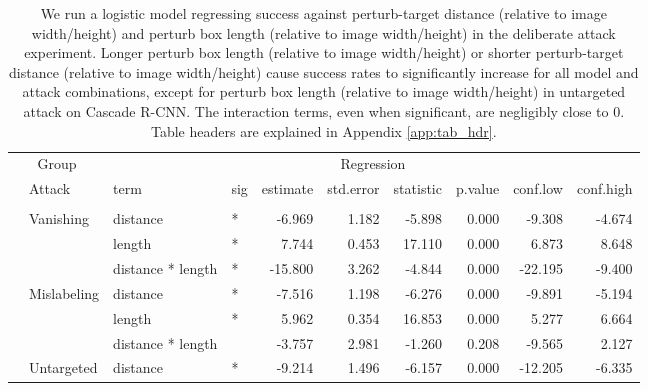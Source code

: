 \begingroup\fontsize{9}{11}\selectfont

\begin{longtable}[t]{llllrrrrrr}
\caption{\label{tab:arbitrary_trend_table}We run a logistic model regressing success against perturb-target distance (relative to image width/height) and perturb box length (relative to image width/height) in the deliberate attack experiment. Longer perturb box length (relative to image width/height) or shorter perturb-target distance (relative to image width/height) cause success rates to significantly increase for all model and attack combinations, except for perturb box length (relative to image width/height) in untargeted attack on Cascade R-CNN. The interaction terms, even when significant, are negligibly close to 0. Table headers are explained in Appendix \ref{app:tab_hdr}.}\\
\toprule
\multicolumn{2}{c}{Group} & \multicolumn{8}{c}{Regression} \\
\cmidrule(l{3pt}r{3pt}){1-2} \cmidrule(l{3pt}r{3pt}){3-10}
 & Attack & term & sig & estimate & std.error & statistic & p.value & conf.low & conf.high\\
\midrule
\addlinespace[0.3em]
\multicolumn{10}{l}{\textbf{YOLOv3}}\\
\hspace{1em} & Vanishing & distance & * & -6.969 & 1.182 & -5.898 & 0.000 & -9.308 & -4.674\\
\cmidrule{3-10}\nopagebreak
\hspace{1em} &  & length & * & 7.744 & 0.453 & 17.110 & 0.000 & 6.873 & 8.648\\
\cmidrule{3-10}\nopagebreak
\hspace{1em} &  & distance * length & * & -15.800 & 3.262 & -4.844 & 0.000 & -22.195 & -9.400\\
\cmidrule{2-10}\nopagebreak
\hspace{1em} & Mislabeling & distance & * & -7.516 & 1.198 & -6.276 & 0.000 & -9.891 & -5.194\\
\cmidrule{3-10}\nopagebreak
\hspace{1em} &  & length & * & 5.962 & 0.354 & 16.853 & 0.000 & 5.277 & 6.664\\
\cmidrule{3-10}\nopagebreak
\hspace{1em} &  & distance * length &  & -3.757 & 2.981 & -1.260 & 0.208 & -9.565 & 2.127\\
\cmidrule{2-10}\nopagebreak
\hspace{1em} & Untargeted & distance & * & -9.214 & 1.496 & -6.157 & 0.000 & -12.205 & -6.335\\

\end{longtable}
